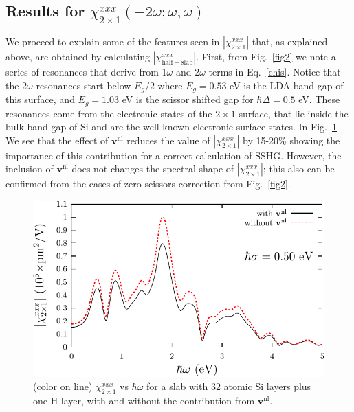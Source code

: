 \documentclass[floatfix,prb,aps,superscriptaddress,showpacs,11pt,preprint,letterpaper]{revtex4}
\begin{document}
\subsection{\texorpdfstring{Results for $\chi^{xxx}_{2\times 1}(-2\omega;\omega,\omega)$}
{Results for Xxxx(2x1)(-2w;w,w)}}

We proceed to explain 
some of the features seen in $|\chi^{xxx}_{2\times 1}|$ that, as
explained above, are obtained 
by calculating $|\chi^{xxx}_{\mathrm{half-slab}}|$.
First, from Fig.~\ref{fig2} we note a series of resonances 
that derive from 1$\omega$ and 2$\omega$ terms in
Eq.~\eqref{chis}. 
Notice that the 
2$\omega$ resonances start below $E_g/2$ where $E_g=0.53$ eV is the LDA
band gap of this surface, and $E_g=1.03$ eV is the scissor shifted gap for
$\hbar\Delta=0.5$ eV.
These resonances
come from the electronic states of the 
$2\times 1$ surface, that lie inside the bulk band gap of Si and are the 
well known electronic surface states.
In Fig.~\ref{fig3}
We see that the effect of $\mathbf{v}^\mathrm{nl}$
 reduces the value of   
$|\chi^{xxx}_{2\times 1}|$  
by 15-20\% 
showing the importance of this contribution for a correct calculation  
of SSHG.  
However, the inclusion of $\mathbf{v}^\mathrm{nl}$ does not
changes the 
spectral shape of $|\chi^{xxx}_{2\times 1}|$;
 this also can be confirmed from
the cases of zero scissors correction from Fig.~\ref{fig2}.
%
\begin{figure}
\centering 
\includegraphics[scale=.8]{plots/fig3}
\caption{(color on line) 
$\chi^{xxx}_{2\times 1}$
vs $\hbar\omega$ for a slab with 32 
atomic Si layers plus one H layer, 
with and without the contribution from $\mathbf{v}^\mathrm{nl}$.
\label{fig3}} 
\end{figure}
\end{document}
